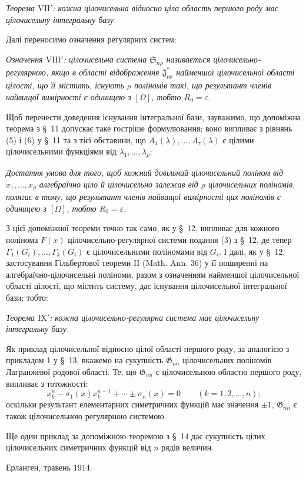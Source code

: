 \documentclass[11pt]{article}
\providecommand{\Ssys}{\mathfrak{S}}
\providecommand{\Jdom}{\mathfrak{J}}
\providecommand{\Gdom}{\mathfrak{G}}
\providecommand{\eps}{\varepsilon}
\begin{document}
\emph{Теорема $\mathrm{VII}'$: кожна цілочисельна відносно ціла область першого роду має цілочисельну інтегральну базу.}

Далі переносимо означення регулярних систем:

\emph{Означення $\mathrm{VIII}'$: цілочисельна система $\Ssys_{n\rho}$ називається цілочисельно-регулярною, якщо в області відображення $\Jdom^*_{\rho\rho}$ найменшої цілочисельної області цілості, що її містить, існують $\rho$ поліномів такі, що результант членів найвищої вимірності є одиницею з $[\Omega]$, тобто $R_0=\eps$.}

Щоб перенести доведення існування інтегральної бази, зауважимо, що допоміжна теорема з \S\ 11 допускає таке гостріше формулювання; воно випливає з рівнянь (5) і (6) у \S\ 11 та з тієї обставини, що $A_1(\lambda),\ldots,A_\tau(\lambda)$ є цілими цілочисельними функціями від $\lambda_1,\ldots,\lambda_\rho$:

\emph{Достатня умова для того, щоб кожний довільний цілочисельний поліном від $x_1,\ldots,x_\rho$ алгебраїчно ціло й цілочисельно залежав від $\rho$ цілочисельних поліномів, полягає в тому, що результант членів найвищої вимірності цих поліномів є одиницею з $[\Omega]$, тобто $R_0=\eps$.}

З цієї допоміжної теореми точно так само, як у \S\ 12, випливає для кожного полінома $F(x)$ цілочисельно-регулярної системи подання (3) з \S\ 12, де тепер $\Gamma_1(G_i),\ldots,\Gamma_k(G_i)$ є цілочисельними поліномами від $G_i$. І далі, як у \S\ 12, застосування Гільбертової теореми II (Math. Ann. 36) у її поширенні на алгебраїчно-цілочисельні поліноми, разом з означенням найменшої цілочисельної області цілості, що містить систему, дає існування цілочисельної інтегральної бази; тобто:

\emph{Теорема $\mathrm{IX}'$: кожна цілочисельно-регулярна система має цілочисельну інтегральну базу.}

Як приклад цілочисельної відносно цілої області першого роду, за аналогією з прикладом 1 у \S\ 13, вкажемо на сукупність $\Gdom_{nn}$ цілочисельних поліномів Лагранжевої родової області. Те, що $\Gdom_{nn}$ є цілочисельною областю першого роду, випливає з тотожності:
\[
  x_k^n-\sigma_1(x)x_k^{n-1}+\cdots\pm\sigma_n(x)=0
  \qquad(k=1,2,\ldots,n);
\]
оскільки результант елементарних симетричних функцій має значення $\pm1$, $\Gdom_{nn}$ є також цілочисельною регулярною системою.

Ще один приклад за допоміжною теоремою з \S\ 14 дає сукупність цілих цілочисельних симетричних функцій від $n$ рядів величин.

Ерланген, травень 1914.
\end{document}
